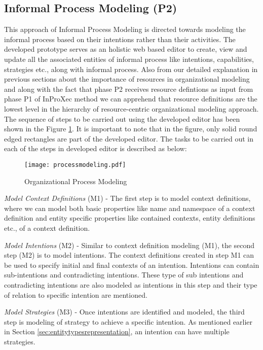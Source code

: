 \subsection{Informal Process Modeling (P2)}
\label{subsec:informalprocessmodeling}
This approach of Informal Process Modeling is directed towards modeling the informal process based on their intentions rather than their activities. The developed prototype serves as an holistic web based editor to create, view and update all the associated entities of informal process like intentions, capabilities, strategies etc., along with informal process. Also from our detailed explanation in previous sections about the importance of resources in organizational modeling  and along with the fact that phase P2 receives resource defintions as input from phase P1 of InProXec method we can apprehend that resource definitions are the lowest level in the hierarchy of resource-centric organizational modeling approach. The sequence of steps to be carried out using the developed editor has been shown in the Figure  \ref{fig:processdiagram}. It is important to note that in the figure, only solid round edged rectangles are part of the developed editor. The tasks to be carried out in each of the steps in developed editor is described as below:

\begin{figure}
		\centering
		\texttt{[image: processmodeling.pdf]}
		\caption{Organizational Process Modeling}
		\label{fig:processdiagram}
\end{figure}

\textit{Model Context Definitions} (M1) -  The first step is to model context definitions, where we can model both basic properties like name and namespace of a context definition and entity specific properties like contained contexts, entity definitions etc., of a context definition.  

\textit{Model Intentions} (M2) -  Similar to context definition modeling (M1), the second step (M2) is to model intentions. The context definitions created in step M1 can be used to specify initial and final contexts of an intention. Intentions can contain sub-intentions and contradicting intentions. These type of sub intentions and contradicting intentions are also modeled as intentions in this step and their type of relation to specific intention are mentioned. 

\textit{Model Strategies} (M3) -  Once intentions are identified and modeled, the third step is modeling of strategy to achieve a specific intention. As mentioned earlier in Section \ref{sec:entitytypesrepresentation}, an intention can have multiple strategies. 

